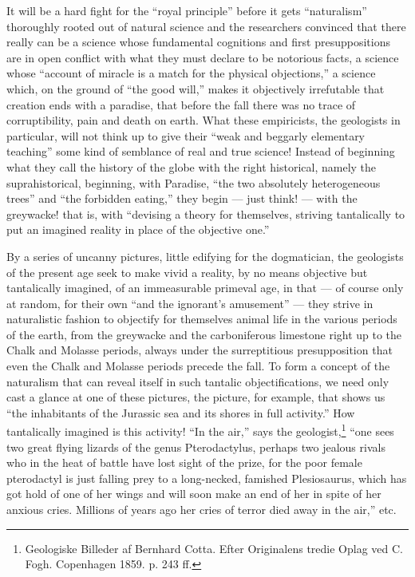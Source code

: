 \documentclass[12pt]{book}
\newcommand{\opage}[1]{\marginnote{\footnotesize\textit{[#1]}}}
\begin{document}
It will be a hard fight for the ``royal principle'' before it gets ``naturalism'' thoroughly rooted out of natural science and the researchers convinced that there really can be a science whose fundamental cognitions and first presuppositions are in open conflict with what they must declare to be notorious facts, a science whose ``account of miracle is a match for the physical objections,'' a science which, on the ground of ``the good will,'' makes it objectively irrefutable that creation ends with a paradise, that before the fall there was no trace of corruptibility, pain and death on earth. What these empiricists, the geologists in particular, will not think up to give their ``weak and beggarly elementary teaching'' some kind of semblance of real and true science! Instead of beginning what they call the history of the globe with the right historical, namely the suprahistorical, beginning, with Paradise, ``the two absolutely heterogeneous trees'' and ``the forbidden eating,'' they begin --- just think! --- with the greywacke! that is, with ``devising a theory for themselves, striving tantalically to put an imagined reality in place of the objective one.''

By a series of uncanny pictures, little edifying for the dogmatician, the geologists of the present age seek to make vivid a reality, by no means objective but tantalically imagined, of an immeasurable primeval age, in that --- of course only at random, for their own ``and the ignorant's amusement'' --- they strive in naturalistic fashion to objectify for themselves animal life in the various periods of the earth, from the greywacke and the carboniferous limestone right up to the Chalk and Molasse periods, always under the surreptitious presupposition
\opage{22}\setcounter{footnote}{0}%
that even the Chalk and Molasse periods precede the fall. To form a concept of the naturalism that can reveal itself in such tantalic objectifications, we need only cast a glance at one of these pictures, the picture, for example, that shows us ``the inhabitants of the Jurassic sea and its shores in full activity.'' How tantalically imagined is this activity! ``In the air,'' says the geologist,\footnote{Geologiske Billeder af Bernhard Cotta. Efter Originalens tredie Oplag ved C. Fogh. Copenhagen 1859. p. 243 ff.} ``one sees two great flying lizards of the genus Pterodactylus, perhaps two jealous rivals who in the heat of battle have lost sight of the prize, for the poor female pterodactyl is just falling prey to a long-necked, famished Plesiosaurus, which has got hold of one of her wings and will soon make an end of her in spite of her anxious cries. Millions of years ago her cries of terror died away in the air,'' etc.
\end{document}
